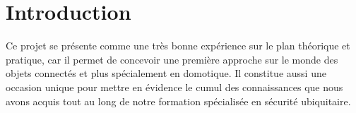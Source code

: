 \clearpage
\newpage


\tableofcontents
\clearpage

%
% 
%
%
%
%



\newpage
\clearpage
\chapter{Introduction}

Ce projet se présente comme une très bonne expérience sur le plan théorique et pratique, car il permet de concevoir une première approche sur le monde des objets connectés et plus spécialement en domotique. Il constitue aussi une occasion unique pour mettre en évidence le cumul des connaissances que nous avons acquis tout au long de notre formation spécialisée en sécurité ubiquitaire.


